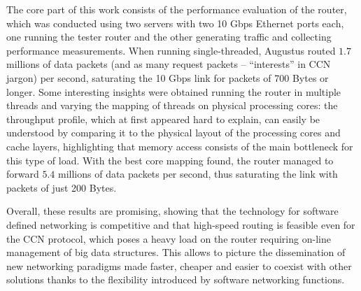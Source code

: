 \documentclass[11pt,a4paper,twoside,titlepage,openany]{book}
\begin{document}
The core part of this work consists of the performance evaluation of the router, which was conducted using two servers with two 10 Gbps Ethernet ports each, one running the tester router and the other generating traffic and collecting performance measurements. When running single-threaded, Augustus routed $1.7$ millions of data packets (and as many request packets -- ``interests'' in CCN jargon) per second, saturating the 10 Gbps link for packets of 700 Bytes or longer. Some interesting insights were obtained running the router in multiple threads and varying the mapping of threads on physical processing cores: %
the throughput profile, which at first appeared hard to explain, can easily be understood by comparing it to the physical layout of the processing cores and cache layers, highlighting that memory access consists of the main bottleneck for this type of load.
With the best core mapping found, the router managed to forward $5.4$ millions of data packets per second, thus saturating the link with packets of just 200 Bytes.

Overall, these results are promising, showing that the technology for software defined networking is competitive and that high-speed routing is feasible even for the CCN protocol, which poses a heavy load on the router requiring on-line management of big data structures.
This allows to picture the dissemination of new networking paradigms made faster, cheaper and easier to coexist with other solutions thanks to the flexibility introduced by software networking functions.




\end{document}
